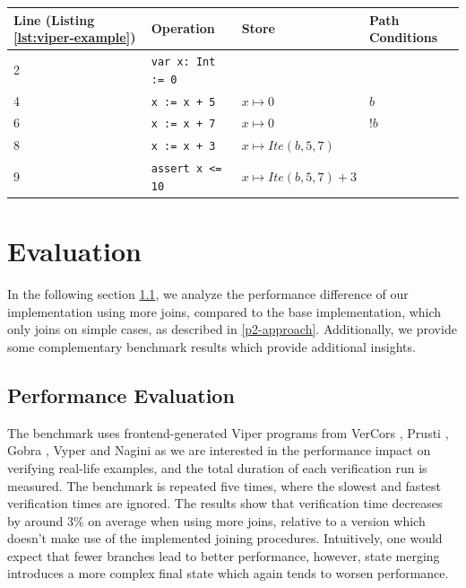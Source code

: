 \documentclass[11pt]{article}
\begin{document}
    \begin{center}
        \begin{tabular}{ l|l|l|l }
            Line (Listing \ref{lst:viper-example}) & Operation & Store & Path Conditions \\
            \hline
            2 & \texttt{var x: Int := 0} & & \\
            4 & \texttt{x := x + 5} & $x \mapsto 0$ & $b$ \\
            6 & \texttt{x := x + 7} & $x \mapsto 0$ & $!b$ \\
            8 & \texttt{x := x + 3} & $x \mapsto Ite(b, 5, 7)$ & \\
            9 & \texttt{assert x <= 10} & $x \mapsto Ite(b, 5, 7) + 3$ & \\
        \end{tabular}
        \label{execution-2}
    \end{center}

    \newpage
    \section{Evaluation}

    In the following section \ref{performance-evaluation}, we analyze the performance difference
    of our implementation using more joins, compared to the base implementation,
    which only joins on simple cases, as described in \ref{p2-approach}. Additionally, we provide some complementary benchmark results
    which provide additional insights. 


    \subsection{Performance Evaluation} \label{performance-evaluation}
    
    The benchmark uses frontend-generated Viper programs from VerCors \cite{vercors},
    Prusti \cite{prusti}, Gobra \cite{gobra}, Vyper \cite{vyper} and Nagini \cite{nagini}
    as we are interested in the performance impact on verifying real-life examples, and
    the total duration of each verification run is measured.
    The benchmark is repeated five times, where the
    slowest and fastest verification times are ignored.
    The results show that verification time
    decreases by around 3\% on average when using more joins,
    relative to a version which doesn't
    make use of the implemented joining procedures.
    Intuitively, one would expect that fewer branches lead to better
    performance, however, state merging introduces a more complex final state which again tends to worsen
    performance.
    
\end{document}
